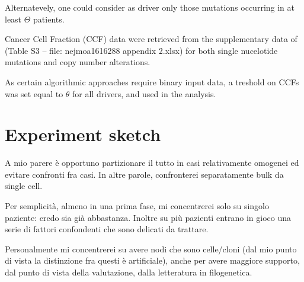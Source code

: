 \documentclass{article}
\begin{document}
Alternatevely, one could consider as driver only those mutations occurring in at least $\Theta$ patients. 

Cancer Cell Fraction (CCF) data were retrieved from the supplementary data of \cite{jamal2017tracking} (Table S3 -- file: nejmoa1616288 appendix 2.xlsx) for both single nucelotide mutations and copy number alterations.

As certain algorithmic approaches require binary input data, a treshold on CCFs was set equal to $\theta$ for all drivers, and used in the analysis. 


\section{Experiment sketch}

A mio parere è opportuno partizionare il tutto in casi relativamente
omogenei ed evitare confronti fra casi. In altre parole, confronterei
separatamente bulk da single cell.

Per semplicità, almeno in una prima fase, mi concentrerei solo su
singolo paziente: credo sia già abbastanza. Inoltre su più pazienti
entrano in gioco una serie di fattori confondenti che sono delicati da
trattare.

Personalmente mi concentrerei su avere nodi che sono celle/cloni (dal
mio punto di vista la distinzione fra questi è artificiale), anche per
avere maggiore supporto, dal punto di vista della valutazione, dalla
letteratura in filogenetica.


\end{document}
